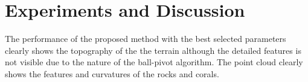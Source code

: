 \chapter{Experiments and Discussion}

The performance of the proposed method with the best selected parameters clearly shows the topography of the the terrain although the detailed
 features is not visible due to the nature of the ball-pivot algorithm. The point cloud clearly shows the features 
 and curvatures of the rocks and corals. 

